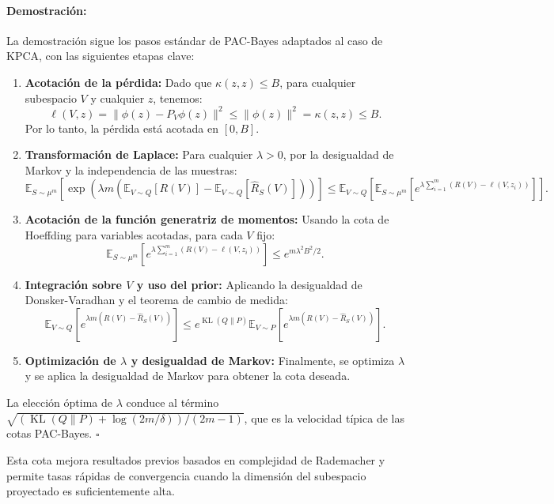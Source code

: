 \documentclass[11pt]{article}
\theoremstyle{plain}
\newenvironment{proof}{\paragraph{Demostración:}}{\hfill$\square$}
\newcommand{\KL}{\operatorname{KL}}
\begin{document}
\begin{proof}
La demostración sigue los pasos estándar de PAC-Bayes adaptados al caso de KPCA, con las siguientes etapas clave:

\begin{enumerate}
    \item \textbf{Acotación de la pérdida:} Dado que $\kappa(z, z) \leq B$, para cualquier subespacio $V$ y cualquier $z$, tenemos:
    \[
    \ell(V, z) = \|\phi(z) - P_V \phi(z)\|^2 \leq \|\phi(z)\|^2 = \kappa(z, z) \leq B.
    \]
    Por lo tanto, la pérdida está acotada en $[0, B]$.
    
    \item \textbf{Transformación de Laplace:} Para cualquier $\lambda > 0$, por la desigualdad de Markov y la independencia de las muestras:
    \[
    \mathbb{E}_{S \sim \mu^m} \left[ \exp\left( \lambda m (\mathbb{E}_{V \sim Q}[R(V)] - \mathbb{E}_{V \sim Q}[\hat{R}_S(V)]) \right) \right] \leq \mathbb{E}_{V \sim Q} \left[ \mathbb{E}_{S \sim \mu^m} \left[ e^{\lambda \sum_{i=1}^m (R(V) - \ell(V, z_i))} \right] \right].
    \]
    
    \item \textbf{Acotación de la función generatriz de momentos:} Usando la cota de Hoeffding para variables acotadas, para cada $V$ fijo:
    \[
    \mathbb{E}_{S \sim \mu^m} \left[ e^{\lambda \sum_{i=1}^m (R(V) - \ell(V, z_i))} \right] \leq e^{m \lambda^2 B^2 / 2}.
    \]
    
    \item \textbf{Integración sobre $V$ y uso del prior:} Aplicando la desigualdad de Donsker-Varadhan y el teorema de cambio de medida:
    \[
    \mathbb{E}_{V \sim Q} \left[ e^{\lambda m (R(V) - \hat{R}_S(V))} \right] \leq e^{\KL(Q\|P)} \mathbb{E}_{V \sim P} \left[ e^{\lambda m (R(V) - \hat{R}_S(V))} \right].
    \]
    
    \item \textbf{Optimización de $\lambda$ y desigualdad de Markov:} Finalmente, se optimiza $\lambda$ y se aplica la desigualdad de Markov para obtener la cota deseada.
\end{enumerate}

La elección óptima de $\lambda$ conduce al término $\sqrt{(\KL(Q\|P) + \log(2m/\delta))/(2m-1)}$, que es la velocidad típica de las cotas PAC-Bayes.
\end{proof}

Esta cota mejora resultados previos basados en complejidad de Rademacher y permite tasas rápidas de convergencia cuando la dimensión del subespacio proyectado es suficientemente alta.
\end{document}

